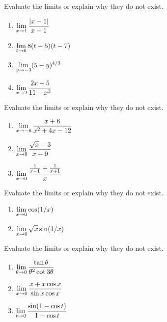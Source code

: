 \setcounter{chapter}{2}
\setcounter{section}{4}
\setcounter{theorem}{0}
\setcounter{equation}{0}


\begin{example}
Evaluate the limits or explain why they do not exist.
\begin{enumerate}
\item $\displaystyle\lim_{x\to 1}\frac{|x-1|}{x-1}$
\vfill
\item $\displaystyle\lim_{t\to 6}8(t-5)(t-7)$
\vfill
\item $\displaystyle\lim_{y\to -3}(5-y)^{4/3}$
\vfill
\item $\displaystyle\lim_{x\to 2}\frac{2x+5}{11-x^3}$
\vfill
\end{enumerate}
\end{example}

\newpage


\begin{example}
Evaluate the limits or explain why they do not exist.
\begin{enumerate}
\item $\displaystyle\lim_{x\to -6}\frac{x+6}{x^2+4x-12}$
\vfill
\item $\displaystyle\lim_{x\to 9}\frac{\sqrt x - 3}{x-9}$
\vfill
\item $\displaystyle\lim_{x\to 0}\frac{\frac{1}{x-1}+\frac{1}{x+1}}{x}$
\vfill
\end{enumerate}
\end{example}

\newpage

\begin{example}
Evaluate the limits or explain why they do not exist.
\begin{enumerate}
\item $\displaystyle\lim_{x\to 0}\cos(1/x)$
\vfill
\item $\displaystyle\lim_{x\to 0}\sqrt x\sin(1/x)$
\vfill
\end{enumerate}
\end{example}

\newpage

\begin{example}
Evaluate the limits or explain why they do not exist.
\begin{enumerate}
\item $\displaystyle\lim_{\theta\to 0}\frac{\tan\theta}{\theta^2\cot 3\theta}$
\vfill
\item $\displaystyle\lim_{x\to 0}\frac{x+x\cos x}{\sin x\cos x}$
\vfill
\item $\displaystyle\lim_{t\to 0}\frac{\sin(1-\cos t)}{1-\cos t}$
\vfill
\end{enumerate}
\end{example}

